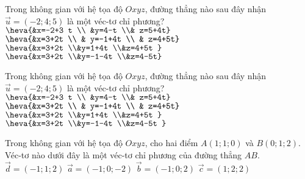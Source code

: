 \begin{ex}%
	Trong không gian với hệ tọa độ $Oxyz$, đường thẳng nào sau đây nhận ${\overrightarrow{u}=(-2 ; 4 ; 5)}$ là một véc-tơ chỉ phương?
	\choice
	{$\heva{&x=-2+3 t \\ &y=4-t \\& z=5+4t}$}
	{$\heva{&x=3+2t \\ & y=-1+4t \\ & z=4+5t}$}
	{$\heva{&x=3+2t  \\&y=1+4t  \\&z=4+5t }$}
	{\True $\heva{&x=3+2t  \\&y=-1-4t  \\&z=4-5t}$}
\end{ex}
\begin{ex}%
	Trong không gian với hệ tọa độ $Oxyz$, đường thẳng nào sau đây nhận $\overrightarrow{u}=(-2;4;5)$ là một véc-tơ chỉ phương?
	\choice
	{$\heva{&x=-2+3 t \\ &y=4-t \\& z=5+4t}$}
	{$\heva{&x=3+2t \\ & y=-1+4t \\ & z=4+5t}$}
	{$\heva{&x=3+2t  \\&y=1+4t  \\&z=4+5t }$}
	{\True $\heva{&x=3+2t  \\&y=-1-4t  \\&z=4-5t }$}
\end{ex}
\begin{ex}%
	Trong không gian với hệ tọa độ $Oxyz$, cho hai điểm $A(1;1;0)$ và $B( 0;1;2 )$. Véc-tơ nào dưới đây là một véc-tơ chỉ phương của đường thẳng $AB$.
	\choice
	{ $\overrightarrow{d}=(-1;1;2)$}
	{ $\overrightarrow{a}=(-1;0;-2)$}
	{\True $\overrightarrow{b}=(-1;0;2)$}
	{ $\overrightarrow{c}=( 1;2;2)$}
\end{ex}
